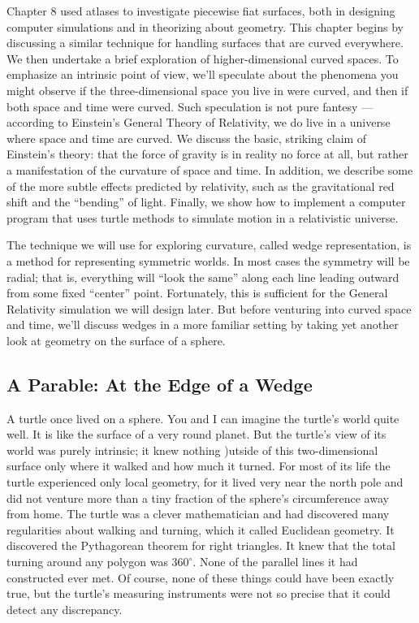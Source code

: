 \documentclass{book}
\begin{document}
Chapter 8 used atlases to investigate piecewise fiat surfaces, both in
designing computer simulations and in theorizing about geometry. This
chapter begins by discussing a similar technique for handling surfaces
that are curved everywhere. We then undertake a brief exploration of
higher-dimensional curved spaces. To emphasize an intrinsic point of
view, we'll speculate about the phenomena you might observe if the
three-dimensional space you live in were curved, and then if both space
and time were curved. Such speculation is not pure fantesy --- according
to Einstein's General Theory of Relativity, we do live in a universe
where space and time are curved. We discuss the basic, striking claim of
Einstein's theory: that the force of gravity is in reality no force at all, but
rather a manifestation of the curvature of space and time. In addition,
we describe some of the more subtle effects predicted by relativity, such
as the gravitational red shift and the ``bending'' of light. Finally, we
show how to implement a computer program that uses turtle methods
to simulate motion in a relativistic universe.

The technique we will use for exploring curvature, called wedge representation, is a method for representing symmetric worlds. In most
cases the symmetry will be radial; that is, everything will ``look the
same'' along each line leading outward from some fixed ``center'' point.
Fortunately, this is sufficient for the General Relativity simulation we
will design later. But before venturing into curved space and time, we'll
discuss wedges in a more familiar setting by taking yet another look at
geometry on the surface of a sphere.

\subsection{A Parable: At the Edge of a Wedge}

A turtle once lived on a sphere. You and I can imagine the turtle's
world quite well. It is like the surface of a very round planet. But the
turtle's view of its world was purely intrinsic; it knew nothing )utside
of this two-dimensional surface only where it walked and how much it
turned. For most of its life the turtle experienced only local geometry,
for it lived very near the north pole and did not venture more than a
tiny fraction of the sphere's circumference away from home. The turtle
was a clever mathematician and had discovered many regularities about
walking and turning, which it called Euclidean geometry. It discovered
the Pythagorean theorem for right triangles. It knew that the total
turning around any polygon was $360^{\circ}$. None of the parallel lines it had
constructed ever met. Of course, none of these things could have been
exactly true, but the turtle's measuring instruments were not so precise
that it could detect any discrepancy.
\end{document}

